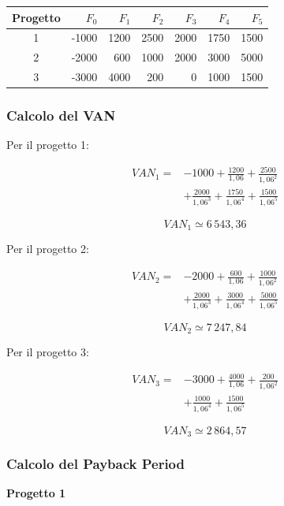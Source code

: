 \begin{center}
\small
\begin{tabular}{|c|r|r|r|r|r|r|}
\hline
\textbf{Progetto} & $F_0$ & $F_1$ & $F_2$ &
$F_3$ & $F_4$ & $F_5$ \\
\hline
1 & -1000 & 1200 & 2500 & 2000 & 1750 & 1500 \\
2 & -2000 & 600 & 1000 & 2000 & 3000 & 5000 \\
3 & -3000 & 4000 & 200 & 0 & 1000 & 1500 \\
\hline
\end{tabular}
\end{center}

\subsubsection*{Calcolo del VAN}

\noindent Per il progetto 1:

\[
\begin{aligned}
VAN_1={}&-1000+\frac{1200}{1{,}06}
+\frac{2500}{1{,}06^2}\\
&+\frac{2000}{1{,}06^3}
+\frac{1750}{1{,}06^4}
+\frac{1500}{1{,}06^5}
\end{aligned}
\]

\[
\boxed{VAN_1\simeq6\,543{,}36}
\]

\noindent Per il progetto 2:

\[
\begin{aligned}
VAN_2={}&-2000+\frac{600}{1{,}06}
+\frac{1000}{1{,}06^2}\\
&+\frac{2000}{1{,}06^3}
+\frac{3000}{1{,}06^4}
+\frac{5000}{1{,}06^5}
\end{aligned}
\]

\[
\boxed{VAN_2\simeq7\,247{,}84}
\]

\noindent Per il progetto 3:

\[
\begin{aligned}
VAN_3={}&-3000+\frac{4000}{1{,}06}
+\frac{200}{1{,}06^2}\\
&+\frac{1000}{1{,}06^4}
+\frac{1500}{1{,}06^5}
\end{aligned}
\]

\[
\boxed{VAN_3\simeq2\,864{,}57}
\]

\subsubsection*{Calcolo del Payback Period}

\noindent \textbf{Progetto 1}

